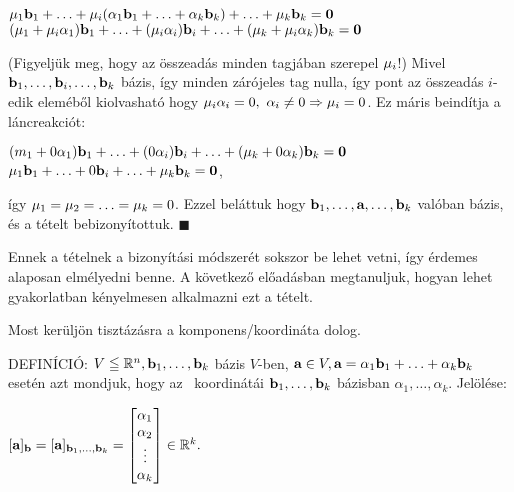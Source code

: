 \documentclass[a4paper,11.5pt]{article}
\begin{document}
	\begin{center}
		$\mu_1\textbf{b}_1+\ldots+\mu_i(\alpha_1\textbf{b}_1+\ldots+\alpha_k\textbf{b}_k)+\ldots+\mu_k\textbf{b}_k=\textbf{0}$\\
		$(\mu_1+\mu_i\alpha_1)\textbf{b}_1+\ldots+(\mu_i\alpha_i)\textbf{b}_i+\ldots+(\mu_k+\mu_i\alpha_k)\textbf{b}_k=\textbf{0}$
	\end{center}
	(Figyeljük meg, hogy az összeadás minden tagjában szerepel $\mu_i$!) Mivel $\textbf{b}_1,\ldots,\textbf{b}_i,\ldots,\textbf{b}_k$ bázis, így minden zárójeles tag nulla, így pont az összeadás $i$-edik eleméből kiolvasható hogy $\m_i\alpha_i=0,\ \alpha_i\not=0 \Rightarrow \mu_i=0$. Ez máris beindítja a láncreakciót:
	
	\begin{center}
		$(m_1+0\alpha_1)\textbf{b}_1+\ldots+(0\alpha_i)\textbf{b}_i+\ldots+(\mu_k+0\alpha_k)\textbf{b}_k=\textbf{0}$\\
		$\mu_1\textbf{b}_1+\ldots+0\textbf{b}_i+\ldots+\mu_k\textbf{b}_k=\textbf{0}$,\\
	\end{center}
	   így $\mu_1=\mu_2=\ldots=\mu_k=0$. Ezzel beláttuk hogy $\textbf{b}_1,\ldots,\textbf{a},\ldots,\textbf{b}_k$ valóban bázis, és a tételt bebizonyítottuk. $\blacksquare$
	
	Ennek a tételnek a bizonyítási módszerét sokszor be lehet vetni, így érdemes alaposan elmélyedni benne. A következő előadásban megtanuljuk, hogyan lehet gyakorlatban kényelmesen alkalmazni ezt a tételt.
	
	Most kerüljön tisztázásra a komponens/koordináta dolog.
	
	DEFINÍCIÓ: $V\leqq \mathbb{R}^{n}, \textbf{b}_1,\ldots,\textbf{b}_k$ bázis $V$-ben, $\textbf{a} \in V, \textbf{a} = \alpha_1\textbf{b}_1+\ldots+\alpha_k\textbf{b}_k$ esetén azt mondjuk, hogy az \a~koordinátái $\textbf{b}_1,\ldots,\textbf{b}_k$ bázisban $\alpha_1, \ldots, \alpha_k$. Jelölése:
	
	\begin{center}
		$[\a]_\b=[\a]_{\b_1,\ldots,\b_k}=
		\begin{bmatrix}
			\alpha_1\s\\
			\alpha_2\s\\
			\vdots\\
			\alpha_k\s
		\end{bmatrix}\in\R^k.$
	\end{center}
	
\end{document}

